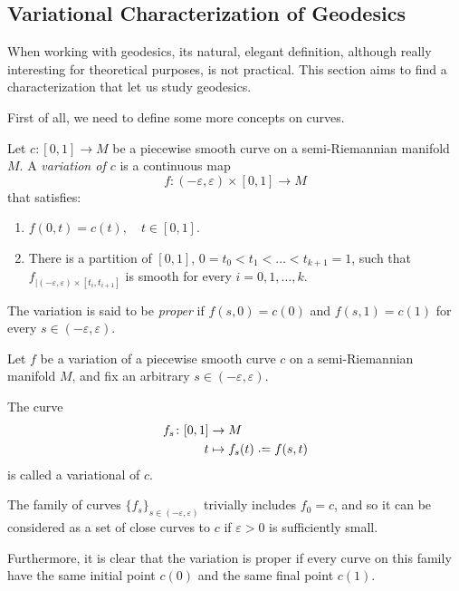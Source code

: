 \subsection{Variational Characterization of Geodesics}

When working with geodesics, its natural, elegant definition, although really interesting for theoretical purposes, is not practical. This section aims to find a characterization that let us study geodesics.

First of all, we need to define some more concepts on curves.

\begin{definition}
	Let $c \colon [0,1] \to M$ be a piecewise smooth curve on a semi-Riemannian manifold $M$. A \emph{variation of $c$} is a continuous map
	\[
		f \colon (-\varepsilon, \varepsilon) \times [0,1] \to M
	\]
	that satisfies:
	\begin{enumerate}
		\item $f(0,t) = c(t), \quad t\in[0,1]$.
		\item There is a partition of $[0,1]$, $0 = t_0 < t_1 < \dots < t_{k+1} = 1$, such that $f_{|(-\varepsilon, \varepsilon) \times [t_i,t_{i+1}]}$ is smooth for every $i = 0, 1, \dots, k$.
	\end{enumerate}

	The variation is said to be \emph{proper} if $f(s,0) = c(0)$ and $f(s,1) = c(1)$ for every $s \in (-\varepsilon, \varepsilon)$.
\end{definition}

\begin{definition}[Variational of $c$]
	Let $f$ be a variation of a piecewise smooth curve $c$ on a semi-Riemannian manifold $M$, and fix an arbitrary $s \in (-\varepsilon, \varepsilon)$.
	
	The curve
	\begin{align*}
		f_s \colon [0,1] &\to M \\
		t &\mapsto f_s(t) \defeq f(s,t)
	\end{align*}
	is called a variational of $c$.
\end{definition}

The family of curves $\{f_s\}_{s\in (-\varepsilon, \varepsilon)}$ trivially includes $f_0 = c$, and so it can be considered as a set of close curves to $c$ if $\varepsilon > 0$ is sufficiently small.

Furthermore, it is clear that the variation is proper if every curve on this family have the same initial point $c(0)$ and the same final point $c(1)$.

